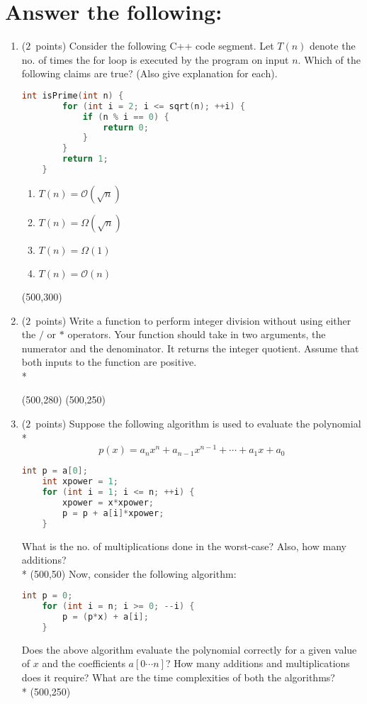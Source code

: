 \documentclass[14pt]{article}
\begin{document}
\section{Answer the following:}
\begin{enumerate}[label=\alph*)]
    \item ($2$\ points)
    Consider the following C++ code segment. Let $T(n)$ denote the no. of times the for loop is executed by the program on input $n$. Which of the following claims are true? (Also give explanation for each).
    \begin{lstlisting}[language=C++, title={Part (a)}]
    int isPrime(int n) {
        for (int i = 2; i <= sqrt(n); ++i) {
            if (n % i == 0) {
                return 0;
            }
        }
        return 1;
    }
    \end{lstlisting}
    \begin{enumerate}[label=\roman*]
        \item $T(n) = \mathcal{O}(\sqrt{n})$
        \item $T(n) = \Omega(\sqrt{n})$
        \item $T(n) = \Omega(1)$
        \item $T(n) = \mathcal{O}(n)$
    \end{enumerate}
    \framebox(500,300){}
    
    \item ($2$\ points)
    Write a function to perform integer division without using either the $/$ or $*$ operators. Your function should take in two arguments, the numerator and the denominator. It returns the integer quotient. Assume that both inputs to the function are positive. \\*
    
    \framebox(500,280){}
    \framebox(500,250){}
    \item ($2$\ points)
    Suppose the following algorithm is used to evaluate the polynomial \\*
    \[p(x) = a_{n}x^{n} + a_{n-1}x^{n-1} + \cdots + a_{1}x + a_{0} \]
    \begin{lstlisting}[language=C++, title={Part (c) - I}]
    int p = a[0];
    int xpower = 1;
    for (int i = 1; i <= n; ++i) {
        xpower = x*xpower;
        p = p + a[i]*xpower;
    }
    \end{lstlisting}
    What is the no. of multiplications done in the worst-case? Also, how many additions? \\*
    \framebox(500,50){}
    Now, consider the following algorithm:
    \begin{lstlisting}[language=C++, title={Part (c) - II}]
    int p = 0;
    for (int i = n; i >= 0; --i) {
        p = (p*x) + a[i];
    }
    \end{lstlisting}
    Does the above algorithm evaluate the polynomial correctly for a given value of $x$ and the coefficients $a[0 \cdots n]$? How many additions and multiplications does it require? What are the time complexities of both the algorithms? \\*
    \framebox(500,250){}
    

\end{enumerate}
\end{document}
